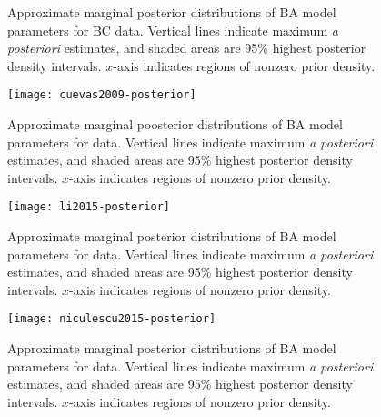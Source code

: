 \clearpage

\begin{figure}[ht]
  \caption[
      Approximate marginal posterior distributions of BA model parameters for
      BC data.
  ]
  {
      Approximate marginal posterior distributions of BA model parameters for
      BC data. Vertical lines indicate maximum \textit{a posteriori} estimates,
      and shaded areas are 95\% highest posterior density intervals. $x$-axis
      indicates regions of nonzero prior density.
  }
  \label{fig:bctree}
\end{figure}

\begin{figure}[ht]
  \texttt{[image: cuevas2009-posterior]}
  \caption[
      Approximate marginal poosterior distributions of BA model parameters for
      \textcite{cuevas2009hiv} data. 
  ]{
      Approximate marginal poosterior distributions of BA model parameters for
      \textcite{cuevas2009hiv} data. Vertical lines indicate maximum \textit{a
      posteriori} estimates, and shaded areas are 95\% highest posterior
      density intervals. $x$-axis indicates regions of nonzero prior density.
  }
  \label{fig:cuevas}
\end{figure}

\begin{figure}[ht]
  \texttt{[image: li2015-posterior]}
  \caption[
      Approximate marginal posterior distributions of BA model parameters for
      \textcite{li2015hiv} data. 
  ]{
      Approximate marginal posterior distributions of BA model parameters for
      \textcite{li2015hiv} data. Vertical lines indicate maximum \textit{a
      posteriori} estimates, and shaded areas are 95\% highest posterior
      density intervals. $x$-axis indicates regions of nonzero prior density.
  }
  \label{fig:li}
\end{figure}

\begin{figure}[ht]
  \texttt{[image: niculescu2015-posterior]}
  \caption[
      Approximate marginal posterior distributions of BA model parameters for
      \textcite{niculescu2015recent} data.
  ]{
      Approximate marginal posterior distributions of BA model parameters for
      \textcite{niculescu2015recent} data. Vertical lines indicate maximum
      \textit{a posteriori} estimates, and shaded areas are 95\% highest
      posterior density intervals. $x$-axis indicates regions of nonzero prior
      density.
  }
  \label{fig:niculescu}
\end{figure}


